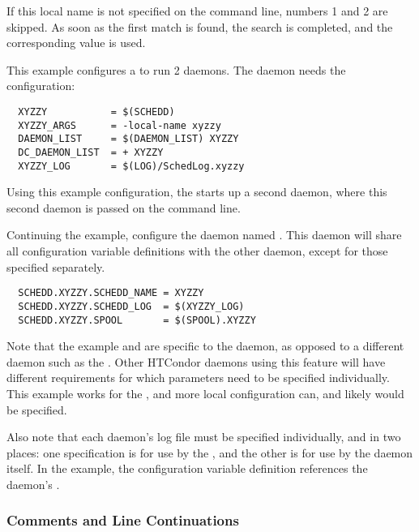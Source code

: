 If this local name is not specified on the command line, 
numbers 1 and 2 are skipped.
As soon as the first match is found, the search is completed,
and the corresponding value is used.

This example configures a  to run 2 
daemons.  The  daemon needs the configuration:
\begin{verbatim}
  XYZZY           = $(SCHEDD)
  XYZZY_ARGS      = -local-name xyzzy
  DAEMON_LIST     = $(DAEMON_LIST) XYZZY
  DC_DAEMON_LIST  = + XYZZY
  XYZZY_LOG       = $(LOG)/SchedLog.xyzzy
\end{verbatim}

Using this example configuration, the  starts up a
second  daemon, 
where this second  daemon is passed 
on the command line.

Continuing the example,
configure the  daemon named .
This  daemon will share all configuration variable
definitions with the other  daemon,
except for those specified separately.

\begin{verbatim}
  SCHEDD.XYZZY.SCHEDD_NAME = XYZZY
  SCHEDD.XYZZY.SCHEDD_LOG  = $(XYZZY_LOG)
  SCHEDD.XYZZY.SPOOL       = $(SPOOL).XYZZY
\end{verbatim}

Note that the example  and  are
specific to the  daemon, as opposed to a different daemon
such as the .
Other HTCondor daemons using this feature will
have different requirements for which parameters need to be
specified individually.  This example works for the ,
and more local configuration can, and likely would be specified.

Also note that each daemon's log file must be specified individually,
and in two places: one specification is for use by the ,
and the other is for use by the daemon itself.
In the example,
the   configuration variable
 definition references the
 daemon's .


\subsubsection{\label{sec:Other-Syntax}Comments and Line Continuations}

